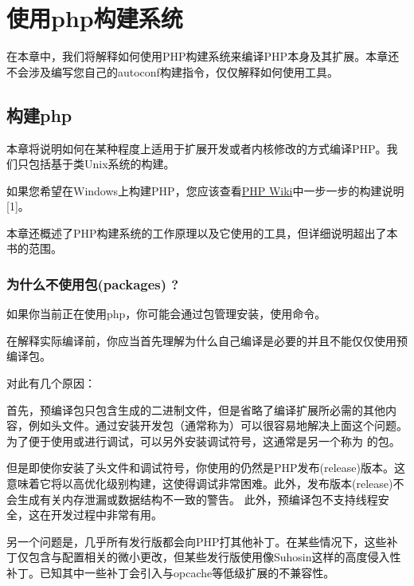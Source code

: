 \chapter{使用php构建系统}

在本章中，我们将解释如何使用PHP构建系统来编译PHP本身及其扩展。本章还不会涉及编写您自己的autoconf构建指令，仅仅解释如何使用工具。

\section{构建php}

\label{sec:building_php}

本章将说明如何在某种程度上适用于扩展开发或者内核修改的方式编译PHP。我们只包括基于类Unix系统的构建。

如果您希望在Windows上构建PHP，您应该查看\href{https://wiki.php.net/internals/windows/stepbystepbuild}{PHP Wiki}中一步一步的构建说明[1]。

本章还概述了PHP构建系统的工作原理以及它使用的工具，但详细说明超出了本书的范围。


\subsection{为什么不使用包(packages) ?}

如果你当前正在使用php，你可能会通过包管理安装，使用命令。

在解释实际编译前，你应当首先理解为什么自己编译是必要的并且不能仅仅使用预编译包。

对此有几个原因：

首先，预编译包只包含生成的二进制文件，但是省略了编译扩展所必需的其他内容，例如头文件。通过安装开发包（通常称为）可以很容易地解决上面这个问题。为了便于使用或进行调试，可以另外安装调试符号，这通常是另一个称为 的包。

但是即使你安装了头文件和调试符号，你使用的仍然是PHP发布(release)版本。这意味着它将以高优化级别构建，这使得调试非常困难。此外，发布版本(release)不会生成有关内存泄漏或数据结构不一致的警告。 此外，预编译包不支持线程安全，这在开发过程中非常有用。

另一个问题是，几乎所有发行版都会向PHP打其他补丁。在某些情况下，这些补丁仅包含与配置相关的微小更改，但某些发行版使用像Suhosin这样的高度侵入性补丁。已知其中一些补丁会引入与opcache等低级扩展的不兼容性。

